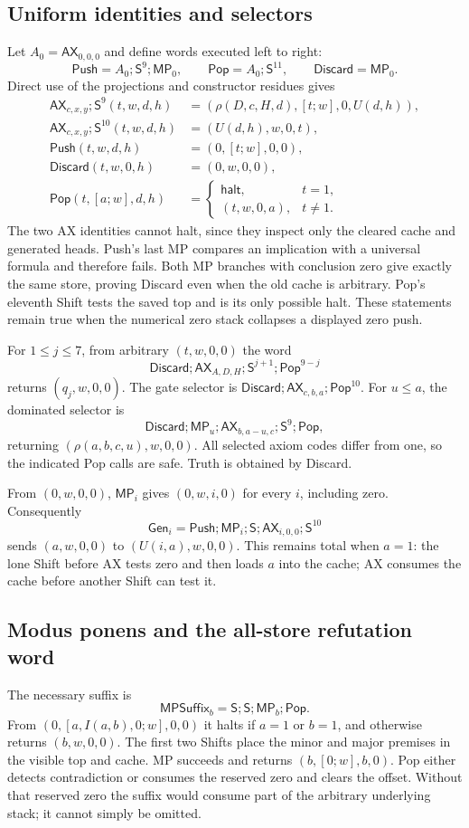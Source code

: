 \documentclass[11pt,letterpaper]{article}
\newcommand{\AX}{\mathsf{AX}}
\newcommand{\MP}{\mathsf{MP}}
\newcommand{\Shift}{\mathsf S}
\newcommand{\Push}{\mathsf{Push}}
\newcommand{\Pop}{\mathsf{Pop}}
\newcommand{\Discard}{\mathsf{Discard}}
\begin{document}
\subsection{Uniform identities and selectors}
Let $A_0=\AX_{0,0,0}$ and define words executed left to right:
\[
 \Push=A_0;\Shift^9;\MP_0,\qquad
 \Pop=A_0;\Shift^{11},\qquad \Discard=\MP_0.
\]
Direct use of the projections and constructor residues gives
\begin{align*}
 \AX_{c,x,y};\Shift^9(t,w,d,h)
    &=(\rho(D,c,H,d),[t;w],0,U(d,h)),\\
 \AX_{c,x,y};\Shift^{10}(t,w,d,h)&=(U(d,h),w,0,t),\\
 \Push(t,w,d,h)&=(0,[t;w],0,0),\\
 \Discard(t,w,0,h)&=(0,w,0,0),\\
 \Pop(t,[a;w],d,h)&=
  \begin{cases}\mathsf{halt},&t=1,\\(t,w,0,a),&t\ne1.
  \end{cases}
\end{align*}
The two AX identities cannot halt, since they inspect only the cleared
cache and generated heads. Push's last MP compares an implication with a
universal formula and therefore fails. Both MP branches with conclusion
zero give exactly the same store, proving Discard even when the old cache
is arbitrary. Pop's eleventh Shift tests the saved top and is its only
possible halt. These statements remain true when the numerical zero stack
collapses a displayed zero push.

For $1\le j\le7$, from arbitrary $(t,w,0,0)$ the word
\[
 \Discard;\AX_{A,D,H};\Shift^{j+1};\Pop^{9-j}
\]
returns $(q_j,w,0,0)$. The gate selector is
$\Discard;\AX_{c,b,a};\Pop^{10}$. For $u\le a$, the dominated selector is
\[
 \Discard;\MP_u;\AX_{b,a-u,c};\Shift^9;\Pop,
\]
returning $(\rho(a,b,c,u),w,0,0)$. All selected axiom codes differ from one,
so the indicated Pop calls are safe. Truth is obtained by Discard.

From $(0,w,0,0)$, $\MP_i$ gives $(0,w,i,0)$ for every $i$, including zero.
Consequently
\[
 \mathsf{Gen}_i=\Push;\MP_i;\Shift;\AX_{i,0,0};\Shift^{10}
\]
sends $(a,w,0,0)$ to $(U(i,a),w,0,0)$. This remains total when $a=1$:
the lone Shift before AX tests zero and then loads $a$ into the cache;
AX consumes the cache before another Shift can test it.

\subsection{Modus ponens and the all-store refutation word}
The necessary suffix is
\[
 \mathsf{MPSuffix}_b=\Shift;\Shift;\MP_b;\Pop.
\]
From $(0,[a,I(a,b),0;w],0,0)$ it halts if $a=1$ or $b=1$, and otherwise
returns $(b,w,0,0)$. The first two Shifts place the minor and major premises
in the visible top and cache. MP succeeds and returns $(b,[0;w],b,0)$.
Pop either detects contradiction or consumes the reserved zero and clears
the offset. Without that reserved zero the suffix would consume part of
the arbitrary underlying stack; it cannot simply be omitted.
\end{document}
